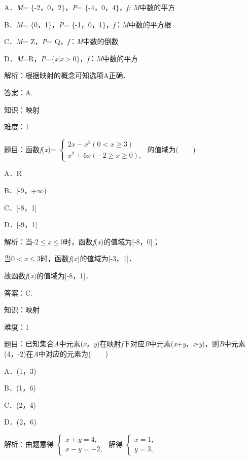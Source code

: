 \documentclass{article} %
\begin{document}
A．\textit{M}= $\mathrm{\{}$-2，0，2$\mathrm{\}}$，\textit{P}=  $\mathrm{\{}$-4，0，4$\mathrm{\}}$，\textit{f: M}中数的平方

B．\textit{M}= $\mathrm{\{}$0，1$\mathrm{\}}$，\textit{P}=  $\mathrm{\{}$-1，0，1$\mathrm{\}}$，\textit{f}：\textit{M}中数的平方根

C．\textit{M}= Z，\textit{P}= Q，\textit{f}：\textit{M}中数的倒数

D．\textit{M}=R，\textit{P}=$\mathrm{\{}$\textit{x}|\textit{x}$\mathrm{>}$0$\mathrm{\}}$，\textit{f}：\textit{M}中数的平方

解析：根据映射的概念可知选项A正确．

答案：A.

知识：映射

难度：1

题目：函数\textit{f}(\textit{x})=
$\left\{
\begin{array}{l}
	2x-x^{2} (0< x\ge 3)\\
	x^{2}+6x (-2\ge x\ge 0),
\end{array}
\right.$
的值域为(　　)

A．R  

B．[-9，+$\mathrm{\infty}$)

C．[-8，1]   

D．[-9，1]

解析：当-2$\mathrm{\le}$\textit{x}$\mathrm{\le}$0时，函数\textit{f}(\textit{x})的值域为[-8，0]；

当0$\mathrm{<}$\textit{x}$\mathrm{\le}$3时，函数\textit{f}(\textit{x})的值域为[-3，1]．

故函数\textit{f}(\textit{x})的值域为[-8，1]．

答案：C.

知识：映射

难度：1

题目：已知集合\textit{A}中元素(\textit{x}，\textit{y})在映射\textit{f}下对应\textit{B}中元素(\textit{x}+\textit{y}，\textit{x}-\textit{y})，则\textit{B}中元素(4，-2)在\textit{A}中对应的元素为(　　)

A．(1，3)   

B．(1，6)

C．(2，4)  

D．(2，6)

解析：由题意得
$\left\{
\begin{array}{l}
	x+y=4,\\
	x-y=-2,
\end{array}
\right.$
解得
$\left\{
\begin{array}{l}
	x=1,\\
	y=3,
\end{array}
\right.$
\end{document}

